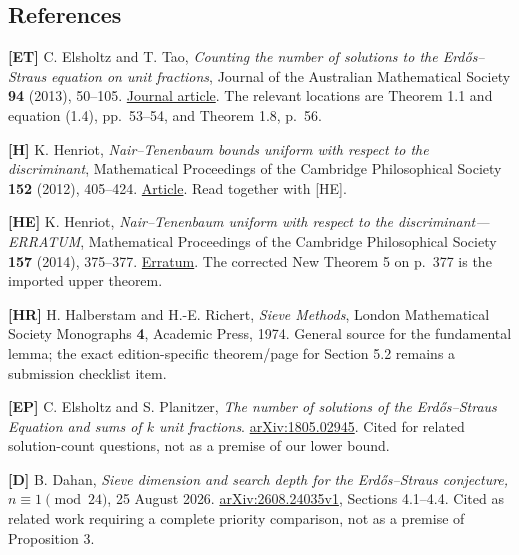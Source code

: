\documentclass[
  english,
  11pt,
]{article}
\begin{document}
\subsection{References}\label{references}

\textbf{{[}ET{]}} C. Elsholtz and T. Tao, \emph{Counting the number of
solutions to the Erdős--Straus equation on unit fractions}, Journal of
the Australian Mathematical Society \textbf{94} (2013), 50--105.
\href{https://doi.org/10.1017/S1446788712000468}{Journal article}. The
relevant locations are Theorem 1.1 and equation (1.4), pp.~53--54, and
Theorem 1.8, p.~56.

\textbf{{[}H{]}} K. Henriot, \emph{Nair--Tenenbaum bounds uniform with
respect to the discriminant}, Mathematical Proceedings of the Cambridge
Philosophical Society \textbf{152} (2012), 405--424.
\href{https://doi.org/10.1017/S0305004111000752}{Article}. Read together
with {[}HE{]}.

\textbf{{[}HE{]}} K. Henriot, \emph{Nair--Tenenbaum uniform with respect
to the discriminant---ERRATUM}, Mathematical Proceedings of the
Cambridge Philosophical Society \textbf{157} (2014), 375--377.
\href{https://doi.org/10.1017/S0305004114000280}{Erratum}. The corrected
New Theorem 5 on p.~377 is the imported upper theorem.

\textbf{{[}HR{]}} H. Halberstam and H.-E. Richert, \emph{Sieve Methods},
London Mathematical Society Monographs \textbf{4}, Academic Press, 1974.
General source for the fundamental lemma; the exact edition-specific
theorem/page for Section 5.2 remains a submission checklist item.

\textbf{{[}EP{]}} C. Elsholtz and S. Planitzer, \emph{The number of
solutions of the Erdős--Straus Equation and sums of \(k\) unit
fractions}. \href{https://arxiv.org/abs/1805.02945}{arXiv:1805.02945}.
Cited for related solution-count questions, not as a premise of our
lower bound.

\textbf{{[}D{]}} B. Dahan, \emph{Sieve dimension and search depth for
the Erdős--Straus conjecture, \(n\equiv1\pmod{24}\)}, 25 August 2026.
\href{https://arxiv.org/html/2608.24035v1}{arXiv:2608.24035v1}, Sections
4.1--4.4. Cited as related work requiring a complete priority
comparison, not as a premise of Proposition 3.
\end{document}
